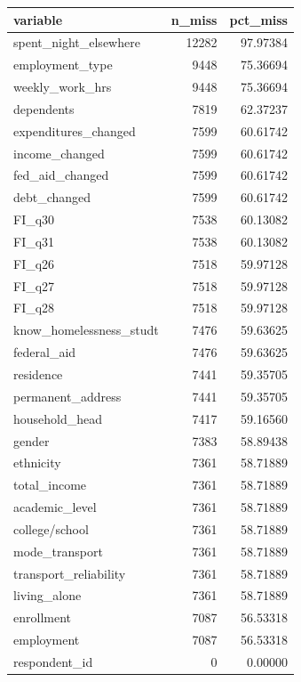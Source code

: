 \documentclass[
  10pt,
]{article}
\begin{document}
\begin{tabular}{l|r|r}
\hline
variable & n\_miss & pct\_miss\\
\hline
spent\_night\_elsewhere & 12282 & 97.97384\\
\hline
employment\_type & 9448 & 75.36694\\
\hline
weekly\_work\_hrs & 9448 & 75.36694\\
\hline
dependents & 7819 & 62.37237\\
\hline
expenditures\_changed & 7599 & 60.61742\\
\hline
income\_changed & 7599 & 60.61742\\
\hline
fed\_aid\_changed & 7599 & 60.61742\\
\hline
debt\_changed & 7599 & 60.61742\\
\hline
FI\_q30 & 7538 & 60.13082\\
\hline
FI\_q31 & 7538 & 60.13082\\
\hline
FI\_q26 & 7518 & 59.97128\\
\hline
FI\_q27 & 7518 & 59.97128\\
\hline
FI\_q28 & 7518 & 59.97128\\
\hline
know\_homelessness\_studt & 7476 & 59.63625\\
\hline
federal\_aid & 7476 & 59.63625\\
\hline
residence & 7441 & 59.35705\\
\hline
permanent\_address & 7441 & 59.35705\\
\hline
household\_head & 7417 & 59.16560\\
\hline
gender & 7383 & 58.89438\\
\hline
ethnicity & 7361 & 58.71889\\
\hline
total\_income & 7361 & 58.71889\\
\hline
academic\_level & 7361 & 58.71889\\
\hline
college/school & 7361 & 58.71889\\
\hline
mode\_transport & 7361 & 58.71889\\
\hline
transport\_reliability & 7361 & 58.71889\\
\hline
living\_alone & 7361 & 58.71889\\
\hline
enrollment & 7087 & 56.53318\\
\hline
employment & 7087 & 56.53318\\
\hline
respondent\_id & 0 & 0.00000\\
\hline
\end{tabular}
\end{document}
